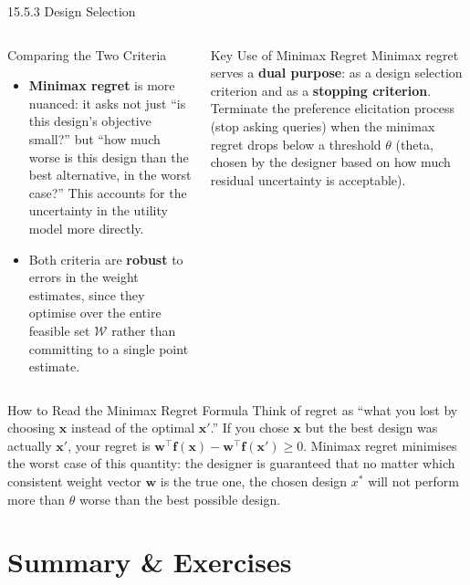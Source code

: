 \documentclass[aspectratio=169,10pt]{beamer}
\newcommand{\bx}{\mathbf{x}}
\newcommand{\bw}{\mathbf{w}}
\newcommand{\bff}{\mathbf{f}}
\begin{document}
\begin{frame}[allowframebreaks]{15.5.3 Design Selection}
\begin{columns}
\begin{block}{Comparing the Two Criteria}
\begin{itemize}
    \item \textbf{Minimax regret} is more nuanced: it asks not just ``is
      this design's objective small?'' but ``how much worse is this design
      than the best alternative, in the worst case?''  This accounts for the
      uncertainty in the utility model more directly.

    \item Both criteria are \textbf{robust} to errors in the weight
      estimates, since they optimise over the entire feasible set
      $\mathcal{W}$ rather than committing to a single point estimate.
  \end{itemize}
\end{block}

\begin{alertblock}{Key Use of Minimax Regret}
  Minimax regret serves a \textbf{dual purpose}: as a design selection
  criterion and as a \textbf{stopping criterion}.  Terminate the preference
  elicitation process (stop asking queries) when the minimax regret drops
  below a threshold $\theta$ (theta, chosen by the designer based on how
  much residual uncertainty is acceptable).
\end{alertblock}
\end{columns}

\begin{alertblock}{How to Read the Minimax Regret Formula}
  Think of regret as ``what you lost by choosing $\bx$ instead of the
  optimal $\bx'$.''  If you chose $\bx$ but the best design was actually
  $\bx'$, your regret is $\bw^\top\bff(\bx) - \bw^\top\bff(\bx') \ge 0$.
  Minimax regret minimises the worst case of this quantity: the designer
  is guaranteed that no matter which consistent weight vector $\bw$ is
  the true one, the chosen design $x^*$ will not perform more than
  $\theta$ worse than the best possible design.
\end{alertblock}

\end{frame}

\section{Summary \& Exercises}
\end{document}
